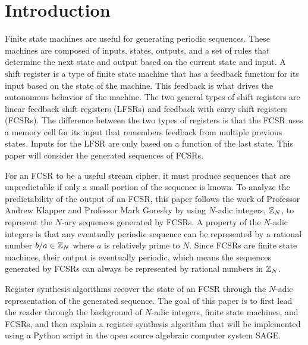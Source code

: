 \section{Introduction}
\par Finite state machines are useful for generating
periodic sequences. These machines are composed of
inputs, states, outputs, and a set of rules that
determine the next state and output based on the current state and input.
A shift register is a type of finite state machine that
has a feedback function for its input based on the state
of the machine. This feedback is what drives the autonomous
behavior of the machine. The two general types of shift
registers are linear feedback shift registers (LFSRs) and
feedback with carry shift registers (FCSRs). The difference
between the two types of registers is that the FCSR uses
a memory cell for its input that remembers feedback from multiple
previous states. Inputs for the LFSR are only based on a
function of the last state. This paper will consider
the generated sequences of FCSRs.

\par For an FCSR to be a useful stream cipher, it must
produce sequences that are unpredictable if only a small
portion of the sequence is known. To analyze the
predictability of the output of an FCSR, this paper follows
the work of Professor Andrew Klapper and Professor Mark Goresky by using
$N$-adic integers, $\mathbb{Z}_N$, to represent the $N$-ary sequences
generated by FCSRs. A property of the $N$-adic integers
is that any eventually periodic sequence can be represented
by a rational number $b/a\in\mathbb{Z}_N$ where $a$ is
relatively prime to $N$. Since FCSRs are finite state
machines, their output is eventually periodic, which means
the sequences generated by FCSRs can always be represented
by rational numbers in $\mathbb{Z}_N$.

\par Register synthesis algorithms recover the state of an FCSR
through the $N$-adic representation of the generated sequence.
The goal of this paper is to first lead the reader through
the background of $N$-adic integers, finite state machines, and FCSRs, and then
explain a register synthesis algorithm that will be
implemented using a Python script in the open source
algebraic computer system SAGE.

